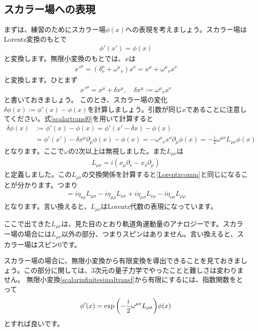 \documentclass[report,paper=a4, fontsize=12pt, line_length=16cm, number_of_lines=33,dvipdfmx]{jlreq}
\numberwithin{equation}{chapter}
\newcommand{\del}{\partial}
\begin{document}
\subsection{スカラー場への表現}
まずは、練習のためにスカラー場$\phi(x)$への表現を考えましょう。スカラー場はLorentz変換のもとで
\begin{align}
  \phi'(x')=\phi(x)\label{scalartransf0}
\end{align}
と変換します。無限小変換のもとでは、$x$は
\begin{align}
  x'^{\mu}=(\delta^{\mu}_{\nu}+\omega^{\mu}{}_{\nu})x^{\nu}=x^{\mu}+\omega^{\mu}{}_{\nu}x^{\nu}
\end{align}
と変換します。ひとまず
\begin{align}
  x'^{\mu}=x^{\mu}+\delta x^{\mu},\quad \delta x^{\mu}:=\omega^{\mu}{}_{\nu}x^{\nu}
\end{align}
と書いておきましょう。
このとき、スカラー場の変化$\delta \phi(x):=\phi'(x)-\phi(x)$を計算しましょう。引数が同じ$x$であることに注意してください。式\eqref{scalartransf0}を用いて計算すると
\begin{align}
  \delta \phi(x)&:=\phi'(x)-\phi(x)=\phi'(x'-\delta x)-\phi(x)\nonumber\\
  &=\phi'(x')-\delta x^{\mu}\del_{\mu}\phi(x)-\phi(x)
  =-\omega^{\mu}{}_{\nu}x^{\nu}\del_{\mu}\phi(x)
  =-\frac{i}{2}\omega^{\mu\nu}L_{\mu\nu}\phi(x)\label{scalarinfinitesimaltransf}
\end{align}
となります。ここで$\omega$の2次以上は無視しました。また$L_{\mu\nu}$は
\begin{align}
  L_{\mu\nu}=i(x_{\mu}\del_{\nu}-x_{\nu}\del_{\mu})
\end{align}
と定義しました。この$L_{\mu\nu}$の交換関係を計算すると\eqref{Lorentzcomm}と同じになることが分かります。つまり
\begin{align}
  [L_{\mu\nu},L_{\rho\sigma}]=i\eta_{\nu\rho}L_{\mu\sigma}-i\eta_{\mu\rho}L_{\nu\sigma}
  +i\eta_{\mu\sigma}L_{\nu\rho}-i\eta_{\nu\sigma}L_{\mu\rho}
\end{align}
となります。言い換えると、$L_{\mu\nu}$はLorentz代数の表現になっています。

ここで出てきた$L_{\mu\nu}$は、見た目のとおり軌道角運動量のアナロジーです。スカラー場の場合には$L_{\mu\nu}$以外の部分、つまりスピンはありません。言い換えると、スカラー場はスピン0です。


スカラー場の場合に、無限小変換から有限変換を導出できることを見ておきましょう。この部分に関しては、3次元の量子力学でやったことと難しさは変わりません。
無限小変換\eqref{scalarinfinitesimaltransf}から有限にするには、指数関数をとって
\begin{align}
  \phi'(x)=\exp\qty(-\frac{i}{2}\omega^{\rho\sigma}L_{\rho\sigma})\phi(x)\label{scalartransf1}
\end{align}
とすれば良いです。
\end{document}
